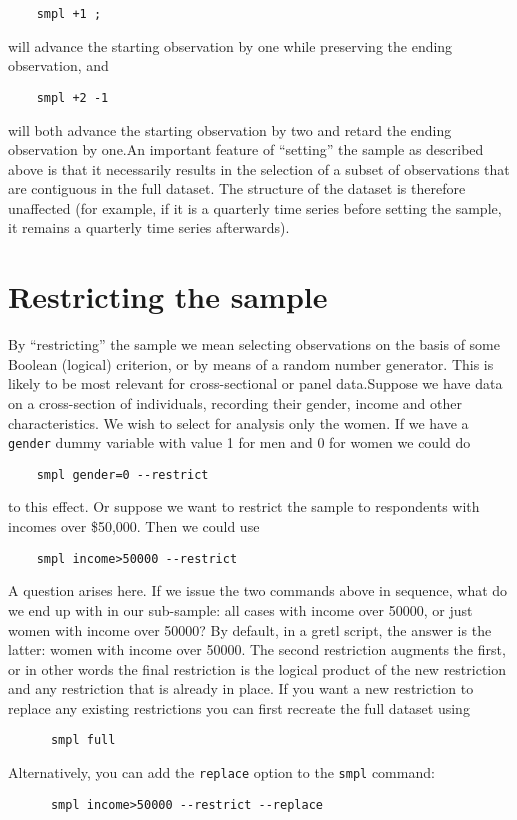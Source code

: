       
\begin{verbatim}
	smpl +1 ;
\end{verbatim}
will advance the starting observation by one while preserving the
ending observation, and

      
\begin{verbatim}
	smpl +2 -1
\end{verbatim}
will both advance the starting observation by two and retard the
ending observation by one.An important feature of ``setting'' the
sample as described above is that it necessarily results in the
selection of a subset of observations that are contiguous in the full
dataset. The structure of the dataset is therefore unaffected (for
example, if it is a quarterly time series before setting the sample,
it remains a quarterly time series afterwards).

\section{Restricting the sample}
\label{sample-restrict}

By ``restricting'' the sample we mean selecting observations on the
basis of some Boolean (logical) criterion, or by means of a random
number generator.  This is likely to be most relevant for
cross-sectional or panel data.Suppose we have data on a cross-section
of individuals, recording their gender, income and other
characteristics.  We wish to select for analysis only the women.  If
we have a \verb+gender+ dummy variable with value 1 for men and 0 for
women we could do
%      
\begin{verbatim}
	smpl gender=0 --restrict
\end{verbatim}
%
to this effect.  Or suppose we want to restrict the sample to
respondents with incomes over \$50,000.  Then we could use
%
\begin{verbatim}
	smpl income>50000 --restrict
\end{verbatim}

A question arises here.  If we issue the two commands above in
sequence, what do we end up with in our sub-sample: all cases with
income over 50000, or just women with income over 50000? By default,
in a gretl script, the answer is the latter: women with income over
50000.  The second restriction augments the first, or in other words
the final restriction is the logical product of the new restriction
and any restriction that is already in place.  If you want a new
restriction to replace any existing restrictions you can first
recreate the full dataset using
%
\begin{verbatim}
      smpl full
\end{verbatim}
%
Alternatively, you can add the \verb+replace+ option to the
\verb+smpl+ command:
%
\begin{verbatim}
      smpl income>50000 --restrict --replace
\end{verbatim}

